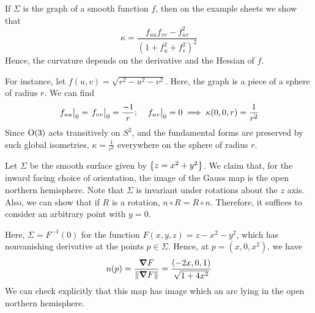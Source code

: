 \documentclass[a4paper,11pt]{article}
\begin{document}
\begin{example}
	If \( \Sigma \) is the graph of a smooth function \( f \), then on the example sheets we show that
	\[
		\kappa = \frac{f_{uu} f_{vv} - f_{uv}^2}{(1+f_u^2 + f_v^2)^2}
	\]
	Hence, the curvature depends on the derivative and the Hessian of \( f \).

	For instance, let \( f(u,v) = \sqrt{r^2 - u^2 - v^2} \).
	Here, the graph is a piece of a sphere of radius \( r \).
	We can find
	\[
		\teval{f_{uu}}0 = \teval{f_{vv}}0 = \frac{-1}{r};\quad \teval{f_{uv}}0 = 0 \implies \kappa(0,0,r) = \frac{1}{r^2}
	\]
	Since \( \mathrm{O}(3) \) acts transitively on \( S^2 \), and the fundamental forms are preserved by such global isometries, \( \kappa = \frac{1}{r^2} \) everywhere on the sphere of radius \( r \).
\end{example}

\begin{example}
	Let \( \Sigma \) be the smooth surface given by \( \qty{z = x^2 + y^2} \).
	We claim that, for the inward facing choice of orientation, the image of the Gauss map is the open northern hemisphere.
	Note that \( \Sigma \) is invariant under rotations about the \( z \) axis.
	Also, we can show that if \( R \) is a rotation, \( n \circ R = R \circ n \).
	Therefore, it suffices to consider an arbitrary point with \( y = 0 \).

	Here, \( \Sigma = F^{-1}(0) \) for the function \( F(x,y,z) = z - x^2 - y^2 \), which has nonvanishing derivative at the points \( p \in \Sigma \).
	Hence, at \( p = (x,0,x^2) \), we have
	\[
		n(p) = \frac{\grad{F}}{\norm{\grad{F}}} = \frac{(-2x,0,1)}{\sqrt{1+4x^2}}
	\]
	We can check explicitly that this map has image which an arc lying in the open northern hemisphere.
\end{example}
\end{document}
